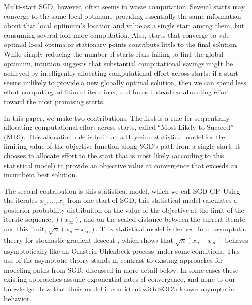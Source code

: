\documentclass{wscpaperproc}
\theoremstyle{wsc}
\newcommand{\abbrv}{MLS}
\newcommand{\name}{Most Likely to Succeed}
\begin{document}
Multi-start SGD, however, often seems to waste computation.  Several starts may converge to the same local optimum, providing essentially the same information about that local optimum's location and value as a single start among them, but consuming several-fold more computation. Also, starts that converge to sub-optimal local optima or stationary points contribute little to the final solution.
While simply reducing the number of starts risks failing to find the global optimum, intuition suggests that substantial computational savings might be achieved by intelligently allocating computational effort across starts: if a start seems unlikely to provide a new globally optimal solution, then we can spend less effort computing additional iterations, and focus instead on allocating effort toward the most promising starts.


In this paper, we make two contributions. The first is a rule for sequentially allocating computational effort across starts, called ``\name'' (\abbrv).  This allocation rule is built on a Bayesian statistical model for the limiting value of the objective function along SGD's path from a single start.  It chooses to allocate effort to the start that is most likely (according to this statistical model) to provide an objective value at convergence that exceeds an incumbent best solution.


The second contribution is this statistical model, which we call SGD-GP.  Using the iterates $x_1,\ldots,x_n$ from one start of SGD, this statistical model calculates a posterior probability distribution on the value of the objective at the limit of the iterate sequence, $f(x_\infty)$, and on the scaled distance between the current iterate and this limit, $\sqrt{n}(x_n - x_\infty)$.
This statistical model is derived from asymptotic theory for stochastic gradient descent \cite{kushner}, which shows 
that $\sqrt{n}(x_{n}-x_{\infty})$ behaves asymptotically like an Ornstein-Uhlenbeck process under some conditions.
This use of the asymptotic theory stands in contrast to existing approaches for modeling paths from SGD, discussed in more detail below. In some cases these existing approaches assume exponential rates of convergence, and none to our knowledge show that their model is consistent with SGD's known asymptotic behavior.
\end{document}
